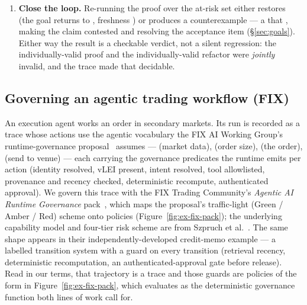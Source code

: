 \begin{enumerate}
\item \textbf{Close the loop.} Re-running the proof over the at-risk set either restores  (the goal
returns to , freshness ) or produces a counterexample --- a  that
 , making the claim contested and resolving the acceptance item 
(\S\ref{sec:goals}). Either way the result is a checkable verdict, not a silent regression: the
individually-valid proof and the individually-valid refactor were \emph{jointly} invalid, and the trace made
that decidable.
\end{enumerate}

\subsection{Governing an agentic trading workflow (FIX)}\label{sec:examples-fix}

An execution agent works an order in secondary markets. Its run is recorded as a trace whose actions use the
agentic vocabulary the FIX AI Working Group's runtime-governance proposal~\cite{fixgov} assumes ---
 (market data),  (order size),  (the order),  (send to
venue) --- each carrying the governance predicates the runtime emits per action (identity resolved, vLEI
present, intent resolved, tool allowlisted, provenance and recency checked, deterministic recompute,
authenticated approval). We govern this trace with the FIX Trading Community's \emph{Agentic AI Runtime
Governance} pack~\cite{ponensfix}, which maps the proposal's traffic-light (Green / Amber / Red) scheme onto
 policies (Figure~\ref{fig:ex-fix-pack}); the underlying capability model and four-tier risk
scheme are from Szpruch et al.~\cite{szpruch}. The same shape appears in their independently-developed
credit-memo example --- a labelled transition system with a guard on every transition (retrieval recency,
deterministic recomputation, an authenticated-approval gate before release). Read in our terms, that
trajectory is a trace and those guards are policies of the form in Figure~\ref{fig:ex-fix-pack}, which
 evaluates as the deterministic governance function both lines of work call for.

